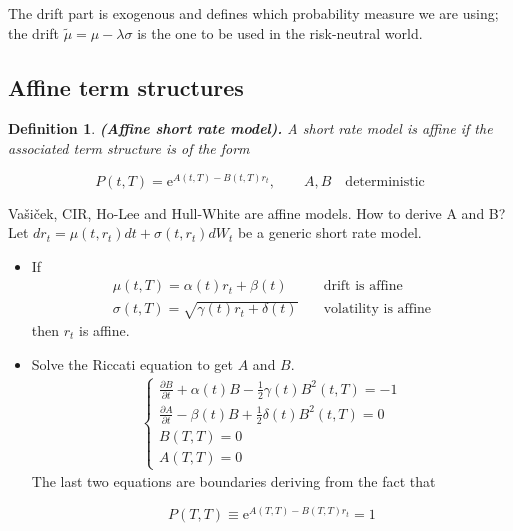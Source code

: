 \documentclass[oneside,titlepage,headinclude,12pt,a4paper,BCOR5mm,footinclude]{book}
\theoremstyle{defn}
\newtheorem{defn}{Definition}
\newcommand{\eexp}{\mathrm{e}}
\newcommand\de\partial
\begin{document}
The drift part is exogenous and  defines which probability measure we are using;
the drift  $\tilde{\mu} =  \mu -  \lambda\sigma$ is the  one to  be used  in the
risk-neutral world.

\subsection{Affine term structures}

\begin{defn}{\textbf{(Affine short rate model).}}
  A short rate  model is \textit{affine} if the associated  term structure is of
  the form

  \[
    P(t,T) = \eexp^{A(t,T) -B(t,T)r_t}, \quad\quad A,B\quad\text{deterministic}
  \]
\end{defn}

Va\v{s}i\v{c}ek, CIR, Ho-Lee  and Hull-White are affine models. How  to derive A
and B? Let  $dr_t = \mu(t,r_t) dt  + \sigma(t,r_t)dW_t$ be a  generic short rate
model.

\begin{itemize}
  \item If 
    \begin{align*}
      \mu(t,T) = \alpha(t)r_t + \beta(t) &\quad \text{drift is affine} \\
      \sigma(t,T) = \sqrt{\gamma(t)r_t + \delta(t)} &\quad \text{volatility is affine}
    \end{align*}
    then $r_t$ is affine.
  \item Solve the Riccati equation to get $A$ and $B$.
    \begin{gather*}
      \begin{cases}
        \frac{\de B}{\de t} + \alpha(t)B - \frac{1}{2}\gamma(t)B^2(t,T) = -1
        \\
        \frac{\de A}{\de t} - \beta(t)B + \frac{1}{2} \delta(t)B^2(t,T) = 0
        \\ B(T,T) = 0
        \\ A(T,T) = 0
      \end{cases}
    \end{gather*}
    The last two equations are boundaries deriving from the fact that

    \[ P(T,T) \equiv \eexp^{A(T,T) - B(T,T)r_t} = 1 \]
\end{itemize}
\end{document}
